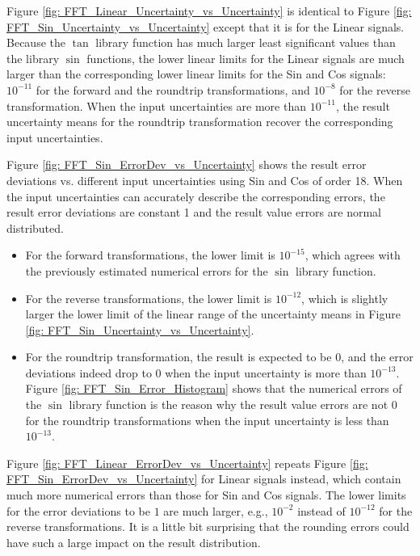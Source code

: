 \documentclass[twoside]{article}
\numberwithin{equation}{section}
\begin{document}
Figure \ref{fig: FFT_Linear_Uncertainty_vs_Uncertainty} is identical to Figure \ref{fig: FFT_Sin_Uncertainty_vs_Uncertainty} except that it is for the Linear signals.
Because the $\tan$ library function has much larger least significant values than the library $\sin$ functions, the lower linear limits for the Linear signals are much larger than the corresponding lower linear limits for the Sin and Cos signals: $10^{-11}$ for the forward and the roundtrip transformations, and $10^{-8}$ for the reverse transformation.
When the input uncertainties are more than $10^{-11}$, the result uncertainty means for the roundtrip transformation recover the corresponding input uncertainties. 

Figure \ref{fig: FFT_Sin_ErrorDev_vs_Uncertainty} shows the result error deviations vs. different input uncertainties using Sin and Cos of order 18.
When the input uncertainties can accurately describe the corresponding errors, the result error deviations are constant 1 and the result value errors are normal distributed.
\begin{itemize}
\item For the forward transformations, the lower limit is $10^{-15}$, which agrees with the previously estimated numerical errors for the $\sin$ library function.

\item For the reverse transformations, the lower limit is $10^{-12}$, which is slightly larger the lower limit of the linear range of the uncertainty means in Figure \ref{fig: FFT_Sin_Uncertainty_vs_Uncertainty}.

\item For the roundtrip transformation, the result is expected to be $0$, and the error deviations indeed drop to $0$ when the input uncertainty is more than $10^{-13}$.
Figure \ref{fig: FFT_Sin_Error_Histogram} shows that the numerical errors of the $\sin$ library function is the reason why the result value errors are not $0$ for the roundtrip transformations when the input uncertainty is less than $10^{-13}$.
\end{itemize}

Figure \ref{fig: FFT_Linear_ErrorDev_vs_Uncertainty} repeats Figure \ref{fig: FFT_Sin_ErrorDev_vs_Uncertainty} for Linear signals instead, which contain much more numerical errors than those for Sin and Cos signals.
The lower limits for the error deviations to be $1$ are much larger, e.g.,  $10^{-2}$ instead of $10^{-12}$ for the reverse transformations.
It is a little bit surprising that the rounding errors could have such a large impact on the result distribution.
\end{document}
